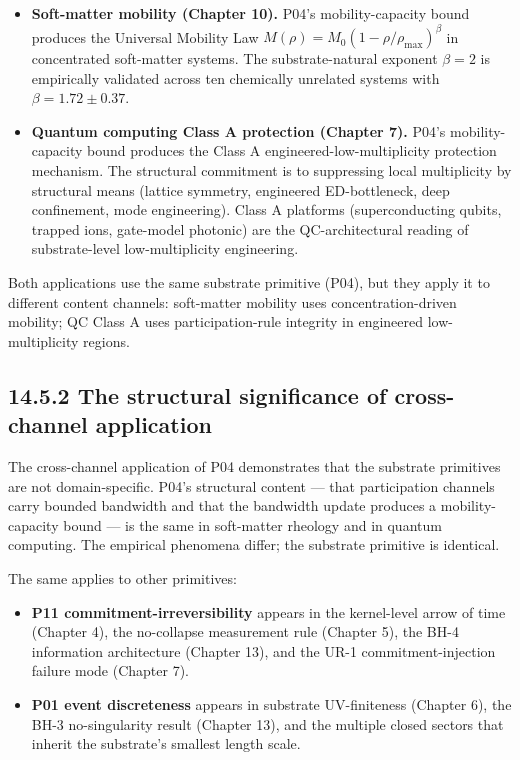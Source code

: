 \documentclass[11pt]{book}
\begin{document}
\begin{itemize}
\item \textbf{Soft-matter mobility (Chapter 10).} P04's mobility-capacity bound produces the Universal Mobility Law $M(\rho) = M_0(1-\rho/\rho_\mathrm{max})^\beta$ in concentrated soft-matter systems. The substrate-natural exponent $\beta = 2$ is empirically validated across ten chemically unrelated systems with $\beta = 1.72 \pm 0.37$.
\item \textbf{Quantum computing Class A protection (Chapter 7).} P04's mobility-capacity bound produces the Class A engineered-low-multiplicity protection mechanism. The structural commitment is to suppressing local multiplicity by structural means (lattice symmetry, engineered ED-bottleneck, deep confinement, mode engineering). Class A platforms (superconducting qubits, trapped ions, gate-model photonic) are the QC-architectural reading of substrate-level low-multiplicity engineering.
\end{itemize}

Both applications use the same substrate primitive (P04), but they apply it to different content channels: soft-matter mobility uses concentration-driven mobility; QC Class A uses participation-rule integrity in engineered low-multiplicity regions.

\subsection{14.5.2 The structural significance of cross-channel application}

The cross-channel application of P04 demonstrates that the substrate primitives are not domain-specific. P04's structural content — that participation channels carry bounded bandwidth and that the bandwidth update produces a mobility-capacity bound — is the same in soft-matter rheology and in quantum computing. The empirical phenomena differ; the substrate primitive is identical.

The same applies to other primitives:

\begin{itemize}
\item \textbf{P11 commitment-irreversibility} appears in the kernel-level arrow of time (Chapter 4), the no-collapse measurement rule (Chapter 5), the BH-4 information architecture (Chapter 13), and the UR-1 commitment-injection failure mode (Chapter 7).
\item \textbf{P01 event discreteness} appears in substrate UV-finiteness (Chapter 6), the BH-3 no-singularity result (Chapter 13), and the multiple closed sectors that inherit the substrate's smallest length scale.
\end{itemize}
\end{document}
